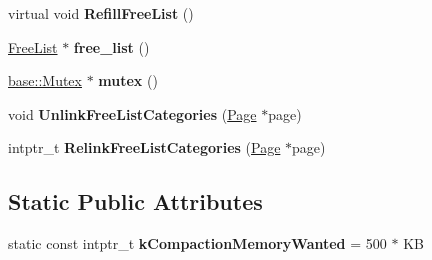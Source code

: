 \begin{DoxyCompactItemize}
\item 
virtual void {\bfseries Refill\+Free\+List} ()\hypertarget{classv8_1_1internal_1_1_paged_space_ab1006806cc0cd72589fa3dfad5892432}{}\label{classv8_1_1internal_1_1_paged_space_ab1006806cc0cd72589fa3dfad5892432}

\item 
\hyperlink{classv8_1_1internal_1_1_free_list}{Free\+List} $\ast$ {\bfseries free\+\_\+list} ()\hypertarget{classv8_1_1internal_1_1_paged_space_ae33395cb348529b779ca8afd5d548747}{}\label{classv8_1_1internal_1_1_paged_space_ae33395cb348529b779ca8afd5d548747}

\item 
\hyperlink{classv8_1_1base_1_1_mutex}{base\+::\+Mutex} $\ast$ {\bfseries mutex} ()\hypertarget{classv8_1_1internal_1_1_paged_space_a853f1a10c66848593987d2d39cbdc18c}{}\label{classv8_1_1internal_1_1_paged_space_a853f1a10c66848593987d2d39cbdc18c}

\item 
void {\bfseries Unlink\+Free\+List\+Categories} (\hyperlink{classv8_1_1internal_1_1_page}{Page} $\ast$page)\hypertarget{classv8_1_1internal_1_1_paged_space_adf9e3e161534bdb4d8db7a404850d7d8}{}\label{classv8_1_1internal_1_1_paged_space_adf9e3e161534bdb4d8db7a404850d7d8}

\item 
intptr\+\_\+t {\bfseries Relink\+Free\+List\+Categories} (\hyperlink{classv8_1_1internal_1_1_page}{Page} $\ast$page)\hypertarget{classv8_1_1internal_1_1_paged_space_a2ff51424ce6fc453c2a1db530a2cf7b5}{}\label{classv8_1_1internal_1_1_paged_space_a2ff51424ce6fc453c2a1db530a2cf7b5}

\end{DoxyCompactItemize}
\subsection*{Static Public Attributes}
\begin{DoxyCompactItemize}
\item 
static const intptr\+\_\+t {\bfseries k\+Compaction\+Memory\+Wanted} = 500 $\ast$ KB\hypertarget{classv8_1_1internal_1_1_paged_space_af7331fcabbf8300ed717f12c5c744726}{}\label{classv8_1_1internal_1_1_paged_space_af7331fcabbf8300ed717f12c5c744726}

\end{DoxyCompactItemize}
